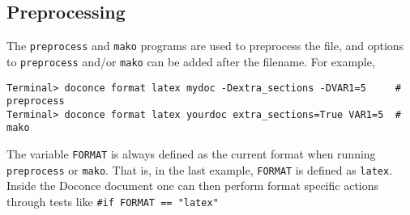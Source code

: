 \documentclass[%
oneside,                 %
final,                   %
10pt]{article}
\begin{document}
\subsection{Preprocessing}

The {\fontsize{10pt}{10pt}\Verb!preprocess!} and {\fontsize{10pt}{10pt}\Verb!mako!} programs are used to preprocess the
file, and options to {\fontsize{10pt}{10pt}\Verb!preprocess!} and/or {\fontsize{10pt}{10pt}\Verb!mako!} can be added after the
filename. For example,
\vspace{4pt}
\begin{Verbatim}[numbers=none,frame=lines,label=\fbox{{\tiny Terminal}},fontsize=\fontsize{9pt}{9pt},
labelposition=topline,framesep=2.5mm,framerule=0.7pt]
Terminal> doconce format latex mydoc -Dextra_sections -DVAR1=5     # preprocess
Terminal> doconce format latex yourdoc extra_sections=True VAR1=5  # mako
\end{Verbatim}
The variable {\fontsize{10pt}{10pt}\Verb!FORMAT!} is always defined as the current format when
running {\fontsize{10pt}{10pt}\Verb!preprocess!} or {\fontsize{10pt}{10pt}\Verb!mako!}. That is, in the last example, {\fontsize{10pt}{10pt}\Verb!FORMAT!} is
defined as {\fontsize{10pt}{10pt}\Verb!latex!}. Inside the Doconce document one can then perform
format specific actions through tests like {\fontsize{10pt}{10pt}\Verb!#if FORMAT == "latex"!}
\end{document}
